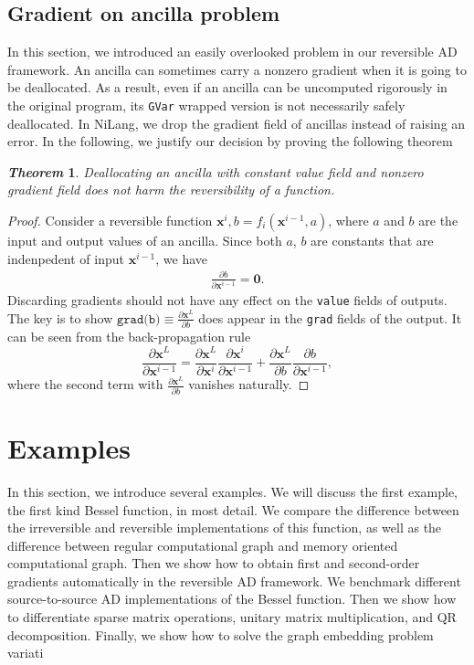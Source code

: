 \documentclass[aps,twocolumn,longbibliography,english,superscriptaddress]{revtex4-1}
\newcommand{\<}{\langle}
\renewcommand{\>}{\rangle}
\newcommand{\vx}{{\mathbf{x}}}
\newtheorem{theorem}{\textit{Theorem}}
\theoremstyle{definition}\newtheorem{definition}{\textit{Definition}}
\begin{document}
\subsection{Gradient on ancilla problem}
In this section, we introduced an easily overlooked problem in our reversible AD framework.
An ancilla can sometimes carry a nonzero gradient when it is going to be deallocated. As a result, even if an ancilla can be uncomputed rigorously in the original program, its \texttt{GVar} wrapped version is not necessarily safely deallocated.
In NiLang, we drop the gradient field of ancillas instead of raising an error.
In the following, we justify our decision by proving the following theorem
\begin{theorem}
    Deallocating an ancilla with constant value field and nonzero gradient field does not harm the reversibility of a function.
\end{theorem}
\begin{proof}
    Consider a reversible function $\vx^i, b = f_i(\vx^{i-1}, a)$, where $a$ and $b$ are the input and output values of an ancilla.
    Since both $a$, $b$ are constants that are indenpedent of input $\vx^{i-1}$, we have
\begin{align}
    \frac{\partial b}{\partial \vx^{i-1}} = \mathbf{0}.
\end{align}
Discarding gradients should not have any effect on the \texttt{value} fields of outputs.
    The key is to show $\texttt{grad(b)} \equiv \frac{\partial \vx^L}{\partial{b}}$ does appear in the \texttt{grad} fields of the output. It can be seen from the back-propagation rule 
\begin{equation}
    \frac{\partial \vx^L}{\partial \vx^{i-1}} = \frac{\partial \vx^L}{\partial \vx^i}\frac{\partial \vx^i}{\partial \vx^{i-1}} + \frac{\partial \vx^L}{\partial b}\frac{\partial b}{\partial \vx^{i-1}},
\end{equation}
where the second term with $\frac{\partial \vx^L}{\partial{b}}$ vanishes naturally.
\end{proof}

\section{Examples}\label{sec:example}

In this section, we introduce several examples.
We will discuss the first example, the first kind Bessel function, in most detail.
We compare the difference between the irreversible and reversible implementations of this function, as well as the difference between regular computational graph and memory oriented computational graph.
Then we show how to obtain first and second-order gradients automatically in the reversible AD framework.
We benchmark different source-to-source AD implementations of the Bessel function.
Then we show how to differentiate sparse matrix operations, unitary matrix multiplication, and QR decomposition.
Finally, we show how to solve the graph embedding problem variati
\end{document}
